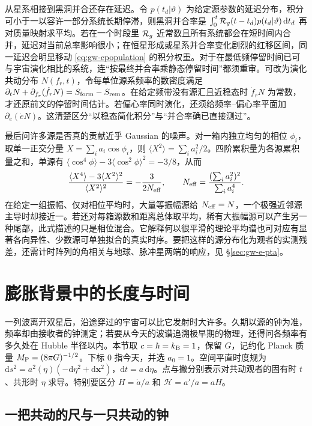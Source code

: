 从星系相接到黑洞并合还存在延迟。令 $p(t_d|\vartheta)$ 为给定源参数的延迟分布，积分可小于一以容许一部分系统长期停滞，则黑洞并合率是 $\int_0^t{\cal R}_g(t-t_d)p(t_d|\vartheta)\,\dd t_d$ 再对质量映射求平均。若在一个时段里 ${\cal R}_g$ 近常数且所有系统都会在短时间内合并，延迟对当前总率影响很小；在恒星形成或星系并合率变化剧烈的红移区间，同一延迟会明显移动 \eqref{eq:gw-cpopulation} 的积分权重。对于在最低频停留时间已可与宇宙演化相比的系统，连“按最终并合率乘静态停留时间”都须重审。可改为演化共动分布 $N(f_r,t)$，令每单位源系频率的数密度满足 $\partial_t N+\partial_{f_r}(\dot f_r N)=S_{\rm form}-S_{\rm rem}$。在给定频带没有源汇且近稳态时 $\dot f_r N$ 为常数，才还原前文的停留时间估计。若偏心率同时演化，还须给频率--偏心率平面加 $\partial_e(\dot e N)$。这清楚区分“以稳态简化积分”与“并合率确已直接测过”。

最后问许多源是否真的贡献近乎 Gaussian 的噪声。对一箱内独立均匀的相位 $\phi_i$，取单一正交分量 $X=\sum_i a_i\cos\phi_i$，则 $\langle X^2\rangle=\sum_i a_i^2/2$。四阶累积量为各源累积量之和，单源有 $\langle\cos^4\phi\rangle-3\langle\cos^2\phi\rangle^2=-3/8$，从而
\[
 \frac{\langle X^4\rangle-3\langle X^2\rangle^2}{\langle X^2\rangle^2}
 =-\frac{3}{2N_{\rm eff}},\qquad
 N_{\rm eff}=\frac{(\sum_i a_i^2)^2}{\sum_i a_i^4}.
\]
在给定一组振幅、仅对相位平均时，大量等振幅源给 $N_{\rm eff}=N$，一个极强近邻源主导时却接近一。若还对每箱源数和距离总体取平均，稀有大振幅源可以产生另一种尾部，此式描述的只是相位混合。它解释何以很平滑的理论平均谱也可对应有显著各向异性、少数源可单独拟合的真实时序。要把这样的源分布化为观者的实测残差，还需计时阵列的角相关与地球、脉冲星两端的响应，见 \S\ref{sec:gw-e-pta}。

\section{膨胀背景中的长度与时间}\label{sec:gw-dbg}

一列波离开双星后，沿途穿过的宇宙可以比它发射时大许多。久期以源的钟为准，频率却由接收者的钟测定；若要从今天的波谱追溯极早期的物理，还得问各频率有多久处在 Hubble 半径以内。本节取 $c=\hbar=k_{\rm B}=1$，保留 $G$，记约化 Planck 质量 $M_{\rm P}=(8\pi G)^{-1/2}$。下标 $0$ 指今天，并选 $a_0=1$。空间平直时度规为 $\mathrm ds^2=a^2(\eta)(-\mathrm d\eta^2+\mathrm d\bm x^2)$，$\mathrm dt=a\,\mathrm d\eta$。点与撇分别表示对共动观者的固有时 $t$、共形时 $\eta$ 求导。特别要区分 $H=\dot a/a$ 和 $\mathcal H=a'/a=aH$。

\subsection{一把共动的尺与一只共动的钟}

